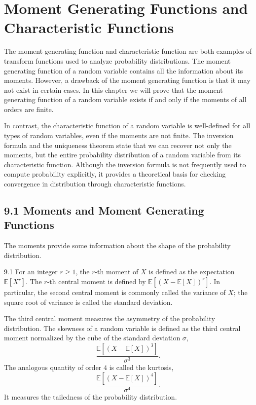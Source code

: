 \section*{Moment Generating Functions and Characteristic Functions}

The moment generating function and characteristic function are both examples of transform functions used to analyze probability distributions. The moment generating function of a random variable contains all the information about its moments. However, a drawback of the moment generating function is that it may not exist in certain cases. In this chapter we will prove that the moment generating function of a random variable exists if and only if the moments of all orders are finite.

In contrast, the characteristic function of a random variable is well-defined for all types of random variables, even if the moments are not finite. The inversion formula and the uniqueness theorem state that we can recover not only the moments, but the entire probability distribution of a random variable from its characteristic function. Although the inversion formula is not frequently used to compute probability explicitly, it provides a theoretical basis for checking convergence in distribution through characteristic functions.

\subsection*{9.1 Moments and Moment Generating Functions}

The moments provide some information about the shape of the probability distribution.

\begin{defbox}{9.1}
For an integer $r \geq 1$, the $r$-th moment of $X$ is defined as the expectation $\mathbb{E}[X^r]$. The $r$-th central moment is defined by $\mathbb{E}[(X-\mathbb{E}[X])^r]$. In particular, the second central moment is commonly called the variance of $X$; the square root of variance is called the standard deviation.

The third central moment measures the asymmetry of the probability distribution. The skewness of a random variable is defined as the third central moment normalized by the cube of the standard deviation $\sigma$,
\[
\frac{\mathbb{E}[(X-\mathbb{E}[X])^3]}{\sigma^3}.
\]
The analogous quantity of order $4$ is called the kurtosis,
\[
\frac{\mathbb{E}[(X-\mathbb{E}[X])^4]}{\sigma^4}.
\]
It measures the tailedness of the probability distribution.
\end{defbox}

